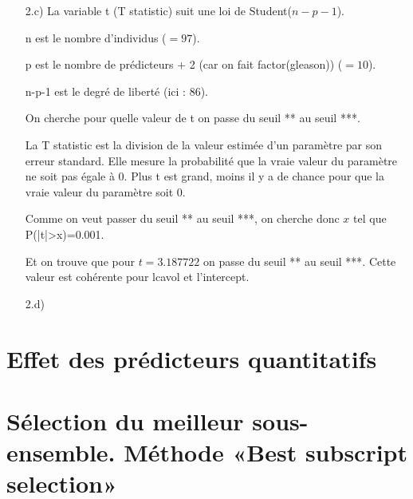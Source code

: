 \documentclass[a4paper, 12pt]{article}
\begin{document}
\begin{enumerate}
\item[2.c)] La variable t (T statistic) suit une loi de Student($n-p-1$).

n est le nombre d'individus ($=97$).
 
p est le nombre de prédicteurs + 2 (car on fait factor(gleason)) ($=10$).

n-p-1 est le degré de liberté (ici : $86$).

On cherche pour quelle valeur de t on passe du seuil ** au seuil ***.

La T statistic est la division de la valeur estimée d'un paramètre par son erreur standard. Elle mesure la probabilité que la vraie valeur du paramètre ne soit pas égale à $0$. Plus t est grand, moins il y a de chance pour que la vraie valeur du paramètre soit $0$.

Comme on veut passer du seuil ** au seuil ***, on cherche donc $x$ tel que P(|t|>x)=0.001.

Et on trouve que pour $t=3.187722$ on passe du seuil ** au seuil ***. Cette valeur est cohérente pour lcavol et l'intercept.

\item[2.d)]

\end{enumerate}

\section{Effet des prédicteurs quantitatifs}



\section{Sélection du meilleur sous-ensemble. Méthode «Best subscript selection»}
\end{document}
